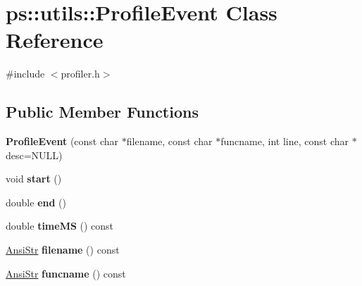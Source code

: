 \hypertarget{classps_1_1utils_1_1ProfileEvent}{}\section{ps\+:\+:utils\+:\+:Profile\+Event Class Reference}
\label{classps_1_1utils_1_1ProfileEvent}


{\ttfamily \#include $<$profiler.\+h$>$}

\subsection*{Public Member Functions}
\begin{DoxyCompactItemize}
\item 
\hypertarget{classps_1_1utils_1_1ProfileEvent_a8dfed0a4d31e715211a92d7d290424df}{}{\bfseries Profile\+Event} (const char $\ast$filename, const char $\ast$funcname, int line, const char $\ast$desc=N\+U\+L\+L)\label{classps_1_1utils_1_1ProfileEvent_a8dfed0a4d31e715211a92d7d290424df}

\item 
\hypertarget{classps_1_1utils_1_1ProfileEvent_add496287924a6850b9d4b56628e31261}{}void {\bfseries start} ()\label{classps_1_1utils_1_1ProfileEvent_add496287924a6850b9d4b56628e31261}

\item 
\hypertarget{classps_1_1utils_1_1ProfileEvent_af1ffa22a6831ae004c8f1cfc7aa573ac}{}double {\bfseries end} ()\label{classps_1_1utils_1_1ProfileEvent_af1ffa22a6831ae004c8f1cfc7aa573ac}

\item 
\hypertarget{classps_1_1utils_1_1ProfileEvent_abdbbdf1f2ac134f94e0ecbac6b92e136}{}double {\bfseries time\+M\+S} () const \label{classps_1_1utils_1_1ProfileEvent_abdbbdf1f2ac134f94e0ecbac6b92e136}

\item 
\hypertarget{classps_1_1utils_1_1ProfileEvent_a7c99ee677515007d4ec89bf5b2e83c66}{}\hyperlink{classps_1_1base_1_1CAString}{Ansi\+Str} {\bfseries filename} () const \label{classps_1_1utils_1_1ProfileEvent_a7c99ee677515007d4ec89bf5b2e83c66}

\item 
\hypertarget{classps_1_1utils_1_1ProfileEvent_a18b5b6ef1b7ab6a4c8cf3334ee2bb2d0}{}\hyperlink{classps_1_1base_1_1CAString}{Ansi\+Str} {\bfseries funcname} () const \label{classps_1_1utils_1_1ProfileEvent_a18b5b6ef1b7ab6a4c8cf3334ee2bb2d0}


\end{DoxyCompactItemize}

